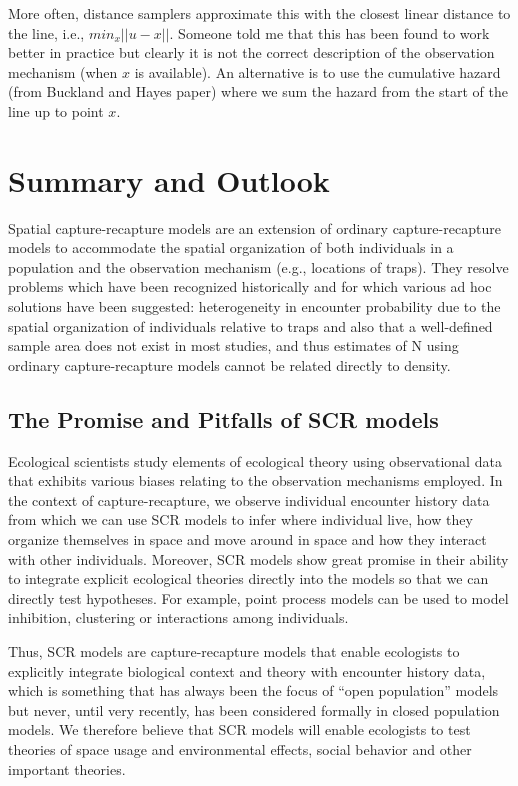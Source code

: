 More often, distance samplers approximate this with the closest linear
distance to the line, i.e., $min_{x} ||u-x||$.  Someone told me that
this has been found to work better in practice but clearly it is not the
correct description of the observation mechanism (when $x$ is available).
An alternative is to use the cumulative hazard (from Buckland and Hayes paper)
where we sum the hazard from the start of the line up to point $x$.



\section{Summary and Outlook}

Spatial capture-recapture models are an extension of ordinary
capture-recapture models to accommodate the spatial organization of
both individuals in a population and the observation mechanism (e.g.,
locations of traps).  They resolve problems which have been recognized
historically and for which various ad hoc solutions have been
suggested: heterogeneity in encounter probability due to the spatial
organization of individuals relative to traps and also that a
well-defined sample area does not exist in most studies, and thus
estimates of N using ordinary capture-recapture models cannot be
related directly to density.


\subsection{The Promise and Pitfalls of SCR models}

Ecological scientists study elements of ecological theory using
observational data that exhibits various biases relating to the
observation mechanisms employed. In the context of capture-recapture,
we observe individual encounter history data from which we can use SCR
models to infer where individual live, how they organize themselves in
space and move around in space and how they interact with other
individuals.  Moreover, SCR models show great promise in their ability
to integrate explicit ecological theories directly into the models so
that we can directly test hypotheses. For example, point process
models can be used to model inhibition, clustering or interactions
among individuals.

Thus, SCR models are capture-recapture models that enable ecologists
to explicitly integrate biological context and theory with encounter
history data, which is something that has always been the focus of
``open population'' models but never, until very recently, has been
considered formally in closed population models. We therefore believe
that SCR models will enable ecologists to test theories of space usage
and environmental effects, social behavior and other important
theories.


